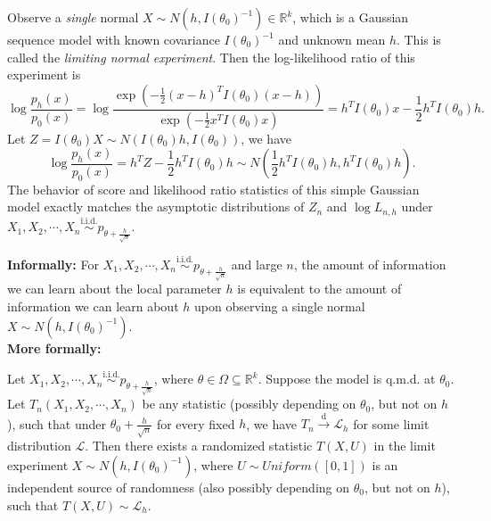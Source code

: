 \documentclass[a4paper]{article}
\begin{document}
\noindent Observe a \emph{single} normal $X \sim N(h,I(\theta_0)^{-1}) \in \mathbb{R}^k$, which is a Gaussian sequence model with known covariance $I(\theta_0)^{-1}$ and unknown mean $h$. This is called the \emph{limiting normal experiment}. Then the log-likelihood ratio of this experiment is
\begin{equation*}
	\log \frac{p_h(x)}{p_0(x)} = \log \frac{\exp \left(-\frac{1}{2} (x-h)^T I(\theta_0) (x-h)\right)}{\exp \left(-\frac{1}{2} x^T I(\theta_0) x\right)} = h^T I(\theta_0)x - \frac{1}{2} h^T I(\theta_0)h.
\end{equation*}
Let $Z = I(\theta_0) X \sim N(I(\theta_0)h, I(\theta_0))$, we have
\begin{equation*}
	\log \frac{p_h(x)}{p_0(x)} = h^T Z - \frac{1}{2} h^T I(\theta_0)h \sim N\left(\frac{1}{2} h^TI(\theta_0)h, h^TI(\theta_0)h\right).
\end{equation*}
The behavior of score and likelihood ratio statistics of this simple Gaussian model exactly matches the asymptotic distributions of $Z_n$ and $\log L_{n,h}$ under $X_1,X_2,\cdots,X_n \stackrel{\text{i.i.d.}}{\sim} p_{\theta+\frac{h}{\sqrt{n}}}$.

\noindent\textbf{Informally:} For $X_1,X_2,\cdots,X_n \stackrel{\text{i.i.d.}}{\sim} p_{\theta+\frac{h}{\sqrt{n}}}$ and large $n$, the amount of information we can learn about the local parameter $h$ is equivalent to the amount of information we can learn about $h$ upon observing a single normal $X \sim N(h,I(\theta_0)^{-1})$. \\

\noindent\textbf{More formally:}
\begin{thm}
	Let $X_1,X_2,\cdots,X_n \stackrel{\text{i.i.d.}}{\sim} p_{\theta+\frac{h}{\sqrt{n}}}$, where $\theta \in \Omega \subseteq \mathbb{R}^k$. Suppose the model is q.m.d. at $\theta_0$. Let $T_n(X_1,X_2,\cdots,X_n)$ be any statistic (possibly depending on $\theta_0$, but not on $h$), such that under $\theta_0 + \frac{h}{\sqrt{n}}$ for every fixed $h$, we have $T_n \stackrel{\text{d}}{\longrightarrow} \mathcal{L}_h$ for some limit distribution $\mathcal{L}$. Then there exists a randomized statistic $T(X,U)$ in the limit experiment $X \sim N(h,I(\theta_0)^{-1})$, where $U \sim Uniform \left([0,1]\right)$ is an independent source of randomness (also possibly depending on $\theta_0$, but not on $h$), such that $T(X,U) \sim \mathcal{L}_h$.
\end{thm}
\end{document}

